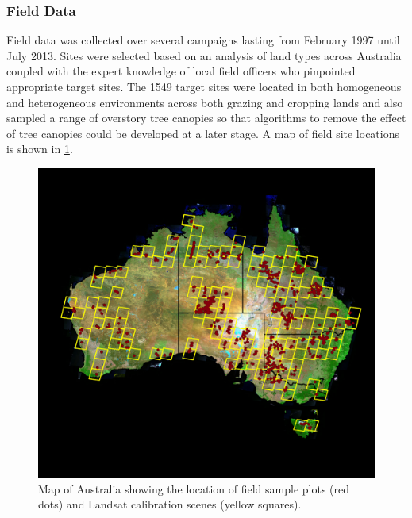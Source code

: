 \documentclass[remotesensing,article,accept,moreauthors,pdftex,12pt,a4paper]{mdpi}
\begin{document}
\subsubsection{Field Data}


Field data was collected over several campaigns lasting from February 1997 until July 2013. Sites were selected based on an analysis of land types across Australia coupled with the expert knowledge of local field officers who pinpointed appropriate target sites. The 1549 target sites were located in both homogeneous and heterogeneous environments across both grazing and cropping lands and also sampled a range of overstory tree canopies so that algorithms to remove the effect of tree canopies could be developed at a later stage. A map of field site locations is shown in \ref{fig:fieldSiteMap}.



\begin{figure}
\includegraphics[width=0.5\paperwidth]{siteMap.pdf}
%
%
\caption{\label{fig:fieldSiteMap} Map of Australia showing the location of field sample plots (red dots) and Landsat calibration scenes (yellow squares).}

\end{figure}
\end{document}
